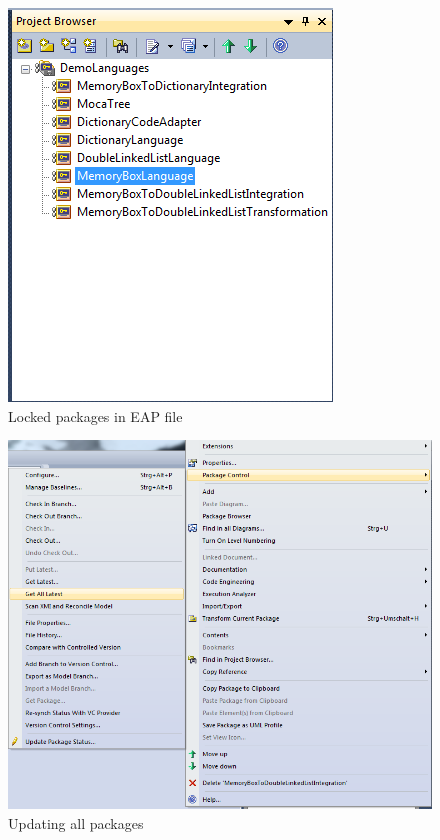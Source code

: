 \begin{enumerate}
\begin{figure}[htbp]
\begin{center}
	\includegraphics[height=0.35\textheight]{pics/advancedTopics/eaSVN/DemoLanguages/006.png}
	\caption{Locked packages in EAP file}
  	\label{fig:advanced-topics-eaSVN-locked}
\end{center}
\end{figure}

\begin{figure}[htbp]
\begin{center}
	\includegraphics[height=0.4\textheight]{pics/advancedTopics/eaSVN/DemoLanguages/009.png}
	\caption{Updating all packages}
  	\label{fig:advanced-topics-eaSVN-getalllatest}
\end{center}
\end{figure}

\end{enumerate}
 
